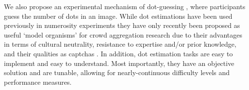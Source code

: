 \documentclass[9pt,twocolumn,twoside,lineno]{pnas-new}
\begin{document}
We also propose an experimental mechanism of dot-guessing \cite{horton2010dot}, where participants guess the number of dots in an image. While dot estimations have been used previously in numerosity experiments \cite{minturn1951effect, indow1977scaling, krueger1982single} they have only recently been proposed as useful ‘model organisms’ for crowd aggregation research \cite{horton2010dot, ugander2015wisdom} due to their advantages in terms of cultural neutrality, resistance to expertise and/or prior knowledge, and their qualities as captchas \cite{von2008recaptcha}. In addition, dot estimation tasks are easy to implement and easy to understand. Most importantly, they have an objective solution and are tunable, allowing for nearly-continuous difficulty levels and performance measures.


\end{document}
